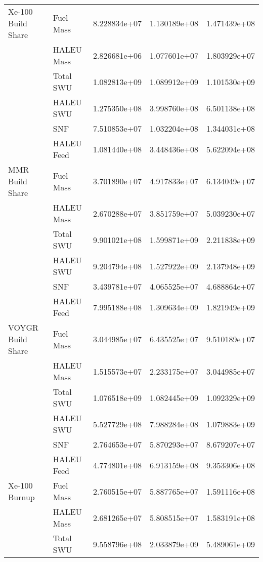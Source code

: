\begin{table}[ht]
\begin{tabular}{llrrr}
        Xe-100 Build Share &  Fuel Mass & 8.228834e+07 & 1.130189e+08 & 1.471439e+08 \\
                           & HALEU Mass & 2.826681e+06 & 1.077601e+07 & 1.803929e+07 \\
                           &  Total SWU & 1.082813e+09 & 1.089912e+09 & 1.101530e+09 \\
                           &  HALEU SWU & 1.275350e+08 & 3.998760e+08 & 6.501138e+08 \\
                           &        SNF & 7.510853e+07 & 1.032204e+08 & 1.344031e+08 \\
                           & HALEU Feed & 1.081440e+08 & 3.448436e+08 & 5.622094e+08 \\\hline 
        MMR Build Share &  Fuel Mass & 3.701890e+07 & 4.917833e+07 & 6.134049e+07 \\
                        & HALEU Mass & 2.670288e+07 & 3.851759e+07 & 5.039230e+07 \\
                        &  Total SWU & 9.901021e+08 & 1.599871e+09 & 2.211838e+09 \\
                        &  HALEU SWU & 9.204794e+08 & 1.527922e+09 & 2.137948e+09 \\
                        &        SNF & 3.439781e+07 & 4.065525e+07 & 4.688864e+07 \\
                        & HALEU Feed & 7.995188e+08 & 1.309634e+09 & 1.821949e+09 \\\hline 
        VOYGR Build Share &  Fuel Mass & 3.044985e+07 & 6.435525e+07 & 9.510189e+07 \\
                          & HALEU Mass & 1.515573e+07 & 2.233175e+07 & 3.044985e+07 \\
                          &  Total SWU & 1.076518e+09 & 1.082445e+09 & 1.092329e+09 \\
                          &  HALEU SWU & 5.527729e+08 & 7.988284e+08 & 1.079883e+09 \\
                          &        SNF & 2.764653e+07 & 5.870293e+07 & 8.679207e+07 \\
                          & HALEU Feed & 4.774801e+08 & 6.913159e+08 & 9.353306e+08 \\\hline 
        Xe-100 Burnup &  Fuel Mass & 2.760515e+07 & 5.887765e+07 & 1.591116e+08 \\
                      & HALEU Mass & 2.681265e+07 & 5.808515e+07 & 1.583191e+08 \\
                      &  Total SWU & 9.558796e+08 & 2.033879e+09 & 5.489061e+09 \\

\end{tabular}
\end{table}
